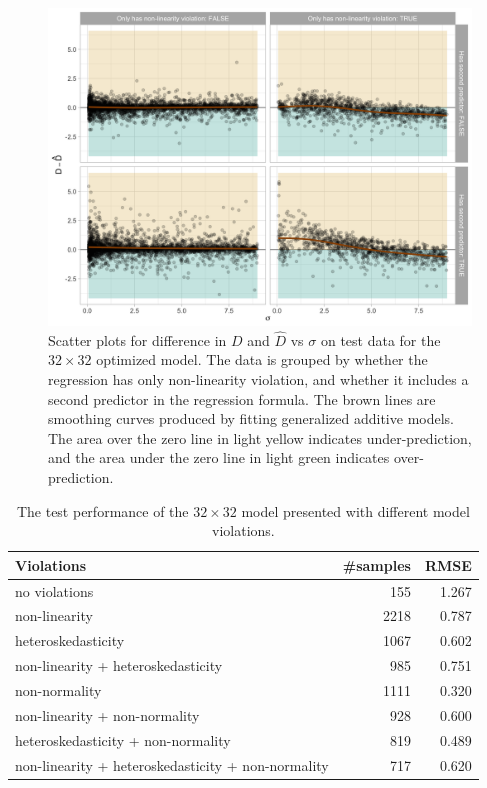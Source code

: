 \documentclass[]{interact}
\theoremstyle{plain}%
\theoremstyle{definition}
\theoremstyle{remark}
\begin{document}
\begin{figure}[!h]

{\centering \includegraphics[width=1\linewidth]{paper_files/figure-latex/over-under-1} 

}

\caption{Scatter plots for difference in $D$ and $\hat{D}$ vs $\sigma$ on test data for the $32 \times 32$ optimized model. The data is grouped by whether the regression has only non-linearity violation, and whether it includes a second predictor in the regression formula. The brown lines are smoothing curves produced by fitting generalized additive models. The area over the zero line in light yellow indicates under-prediction, and the area under the zero line in light green indicates over-prediction.}\label{fig:over-under}
\end{figure}

\begin{table}

\caption{\label{tab:performance-sub}The test performance of the $32 \times 32$ model presented with different model violations.}
\centering
\begin{tabular}[t]{lrr}
\toprule
Violations & \#samples & RMSE\\
\midrule
no violations & 155 & 1.267\\
non-linearity & 2218 & 0.787\\
heteroskedasticity & 1067 & 0.602\\
non-linearity + heteroskedasticity & 985 & 0.751\\
non-normality & 1111 & 0.320\\
non-linearity + non-normality & 928 & 0.600\\
heteroskedasticity + non-normality & 819 & 0.489\\
non-linearity + heteroskedasticity + non-normality & 717 & 0.620\\
\bottomrule
\end{tabular}
\end{table}
\end{document}
